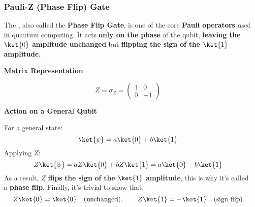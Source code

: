 \subsubsection{Pauli-Z (Phase Flip) Gate}\label{subsubsection: Pauli-Z Phase Flip Gate}

The , also called the \textbf{Phase Flip Gate}, is one of the core \textbf{Pauli operators} used in quantum computing. It acts \textbf{only on the phase} of the qubit, \textbf{leaving the $\ket{0}$ amplitude unchanged} but \textbf{flipping the sign of the $\ket{1}$ amplitude}.

\highspace
\begin{flushleft}
    \textcolor{Green3}{ \textbf{Matrix Representation}}
\end{flushleft}
\begin{equation}
    Z = \sigma_{Z} = 
    \begin{pmatrix}
        1 & 0 \\
        0 & -1
    \end{pmatrix}
\end{equation}

\highspace
\begin{flushleft}
    \textcolor{Green3}{ \textbf{Action on a General Qubit}}
\end{flushleft}
For a general state:
\begin{equation*}
    \ket{\psi} = a\ket{0} + b\ket{1}
\end{equation*}
Applying $Z$:
\begin{equation*}
    Z\ket{\psi} = aZ\ket{0} + bZ\ket{1} = a\ket{0} - b\ket{1}
\end{equation*}
As a result, $Z$ \textbf{flips the sign of the $\ket{1}$ amplitude}, this is why it's called a \textbf{phase flip}. Finally, it's trivial to show that:
\begin{equation*}
    Z\ket{0} = \ket{0} \hspace{1em} \text{(unchanged)}, \hspace{2em} Z\ket{1} = -\ket{1} \hspace{1em} \text{(sign flip)}
\end{equation*}


